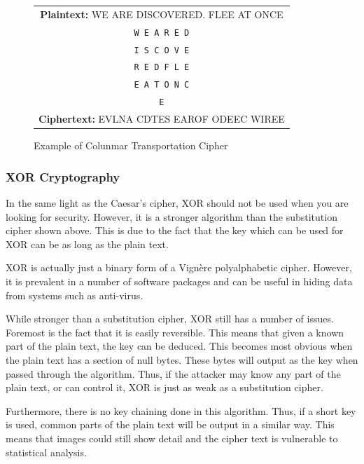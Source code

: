 				\begin{figure}[htb]
					\centering
					\begin{tabular}{|c|}
						\hline
						\textbf{Plaintext:}  WE ARE DISCOVERED. FLEE AT ONCE \\
						\texttt{W\,E\,A\,R\,E\,D} \\
						\texttt{I\,S\,C\,O\,V\,E} \\
						\texttt{R\,E\,D\,F\,L\,E} \\
						\texttt{E\,A\,T\,O\,N\,C} \\
						\texttt{E\thinspace\hphantom{A\,T\,O\,N\,C}}	\\
						\textbf{Ciphertext:} EVLNA CDTES EAROF ODEEC WIREE \\
						\hline
					\end{tabular}
					\caption{Example of Colunmar Transportation Cipher}
					\label{fig:ColumnarTransportation}
				\end{figure}

			\subsubsection{XOR Cryptography}
				In the same light as the Caesar's cipher, XOR should not be used when you are looking for security.
				However, it is a stronger algorithm than the substitution cipher shown above.
				This is due to the fact that the key which can be used for XOR can be as long as the plain text.

				XOR is actually just a binary form of a Vign\`{e}re polyalphabetic cipher.
				However, it is prevalent in a number of software packages and can be useful in hiding data from systems such as anti-virus.

				While stronger than a substitution cipher, XOR still has a number of issues.
				Foremost is the fact that it is easily reversible.
				This means that given a known part of the plain text, the key can be deduced.
				This becomes most obvious when the plain text has a section of null bytes.
				These bytes will output as the key when passed through the algorithm.
				Thus, if the attacker may know any part of the plain text, or can control it, XOR is just as weak as a substitution cipher.

				Furthermore, there is no key chaining done in this algorithm.
				Thus, if a short key is used, common parts of the plain text will be output in a similar way.
				This means that images could still show detail and the cipher text is vulnerable to statistical analysis.

